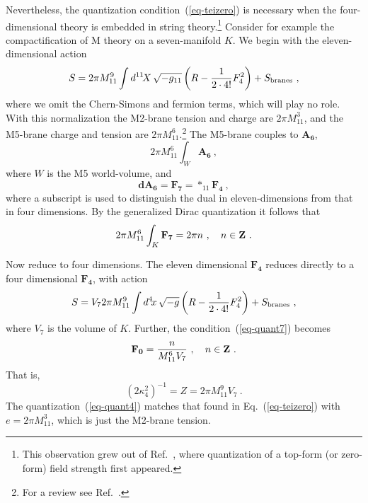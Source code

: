 \documentclass[12pt]{article}
\begin{document}
Nevertheless, the quantization condition~(\ref{eq-teizero}) is
necessary when the four-dimensional theory is embedded in string
theory.\footnote {This observation grew out of Ref.~\cite{PolStr96},
where quantization of a top-form (or zero-form) field strength first
appeared.}  Consider for example the compactification of M theory on a
seven-manifold $K$.  We begin with the eleven-dimensional action
\begin{equation}
S = {2\pi M_{11}^9} \int d^{11}\!X\, \sqrt{-g_{11}} \left( R -
    \frac{1}{2 \cdot 4!}  F_4^2 \right) + S_{\rm
    branes}\ ,
\label{eq-act1}
\end{equation}
where we omit the Chern-Simons and fermion terms, which will play no
role.  With this normalization the M2-brane tension and charge are
$2\pi M_{11}^3$, and the M5-brane charge and tension are $ 2\pi
M_{11}^6$.\footnote {For a review see Ref.~\cite{DufKhu94}.} The
M5-brane couples to $\mathbf{A_{6}}$,
\begin{equation}
{2\pi M_{11}^6} \int_{W} \mathbf{A_{6}}\ ,
\end{equation}
where $W$ is the M5 world-volume, and
\begin{equation}
\mathbf{dA_{6}} = \mathbf{F_{7}} = *_{11}\mathbf{F_{4}}\ ,
\end{equation}
where a subscript is used to distinguish the dual in eleven-dimensions
from that in four dimensions.  By the generalized Dirac quantization
it follows that
\begin{equation}
{2\pi M_{11}^6} \int_K \mathbf{F_{7}} = 2\pi n\ , \quad n \in {\bf
Z}\ .
\label{eq-quant7}
\end{equation}

Now reduce to four dimensions.  The eleven dimensional
$\mathbf{F_{4}}$ reduces directly to a four dimensional
$\mathbf{F_{4}}$, with action
\begin{equation}
S = V_7 {2\pi M_{11}^9} \int d^{4}\!x\, \sqrt{-g} \left(
R - \frac{1}{2 \cdot 4!}  F_4^2 \right) + S_{\rm
    branes}\ ,
\label{eq-act4}
\end{equation}
where $V_7$ is the volume of $K$.  Further, the
condition~(\ref{eq-quant7}) becomes
\begin{equation}
\mathbf{F_{0}} = \frac{ n}{M_{11}^6 V_7}\ , \quad n \in {\bf Z}\ .
\label{eq-quant4}
\end{equation}
That is,
\begin{equation}
(2\kappa_4^2)^{-1} = Z = {2\pi M_{11}^9  V_7} \ .
\label{eq-red}
\end{equation}
The quantization~(\ref{eq-quant4}) matches that found in
Eq.~(\ref{eq-teizero}) with $e = 2\pi M_{11}^3$, which is just the
M2-brane tension.
\end{document}
